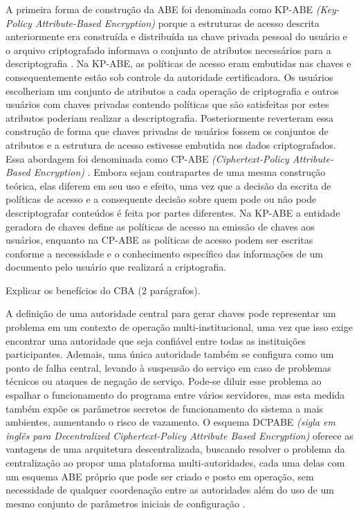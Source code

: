 \documentclass[a4paper,11pt]{article}
\begin{document}
A primeira forma de construção da ABE foi denominada como KP-ABE \emph{(Key-Policy Attribute-Based Encryption)} porque a estruturas de acesso descrita anteriormente era construída e distribuída na chave privada pessoal do usuário e o arquivo criptografado informava o conjunto de atributos necessários para a descriptografia \cite{Goyal2006}. %
Na KP-ABE, as políticas de acesso eram embutidas nas chaves e consequentemente estão sob controle da autoridade certificadora.
Os usuários escolheriam um conjunto de atributos a cada operação de criptografia e outros usuários com chaves privadas contendo políticas que são satisfeitas por estes atributos poderiam realizar a descriptografia.
Posteriormente reverteram essa construção de forma que chaves privadas de usuários fossem os conjuntos de atributos e a estrutura de acesso estivesse embutida nos dados criptografados.
Essa abordagem foi denominada como CP-ABE \emph{(Ciphertext-Policy Attribute-Based Encryption)} \cite{Bethencourt2007}.
Embora sejam contrapartes de uma mesma construção teórica, elas diferem em seu uso e efeito, uma vez que a decisão da escrita de políticas de acesso e a consequente decisão sobre quem pode ou não pode descriptografar conteúdos é feita por partes diferentes.
Na KP-ABE a entidade geradora de chaves define as políticas de acesso na emissão de chaves aos usuários, enquanto na CP-ABE as políticas de acesso podem ser escritas conforme a necessidade e o conhecimento específico das informações de um documento pelo usuário que realizará a criptografia.

{\color{ForestGreen}Explicar os benefícios do CBA (2 parágrafos).}

A definição de uma autoridade central para gerar chaves pode representar um problema em um contexto de operação multi-institucional, uma vez que isso exige encontrar uma autoridade que seja confiável entre todas as instituições participantes.
Ademais, uma única autoridade também se configura como um ponto de falha central, levando à suspensão do serviço em caso de problemas técnicos ou ataques de negação de serviço.
Pode-se diluir esse problema ao espalhar o funcionamento do programa entre vários servidores, mas esta medida também expõe os parâmetros secretos de funcionamento do sistema a mais ambientes, aumentando o risco de vazamento.
O esquema DCPABE \emph{(sigla em inglês para Decentralized Ciphertext-Policy Attribute Based Encryption)} oferece as vantagens de uma arquitetura descentralizada, buscando resolver o problema da centralização ao propor uma plataforma multi-autoridades, cada uma delas com um esquema ABE próprio que pode ser criado e posto em operação, sem necessidade de qualquer coordenação entre as autoridades além do uso de um mesmo conjunto de parâmetros iniciais de configuração \cite{Lewko2011}.
\end{document}
